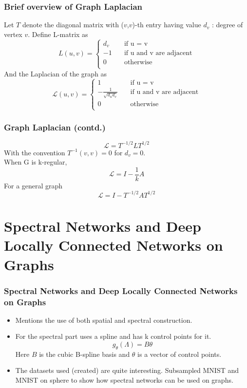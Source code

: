 \documentclass{beamer}
\begin{document}
\begin{frame}
  \frametitle{Brief overview of Graph Laplacian}
  Let $T$ denote the diagonal matrix with ($v$,$v$)-th entry having value $d_v$ : degree of vertex $v$.
  Define L-matrix as
  \[
    L(u,v) =
    \begin{cases}
      d_v &\quad\text{if u = v}\\
      -1 &\quad\text{if u and v are adjacent}\\
      0 &\quad \text{otherwise}\\
    \end{cases}
  \]
  And the Laplacian of the graph as
  \[
    \mathcal{L}(u,v) =
    \begin{cases}
      1 &\quad\text{if u = v}\\
      -\frac{1}{\sqrt{d_ud_v}} &\quad\text{if u and v are adjacent}\\
      0 &\quad \text{otherwise}\\
    \end{cases}
  \]
\end{frame}

\begin{frame}
  \frametitle{Graph Laplacian (contd.)}
  $$\mathcal{L} = T^{-1/2}LT^{1/2}$$
  With the convention $T^{-1}(v,v) = 0$ for $d_v = 0$.\\
  When G is k-regular,
  $$\mathcal{L} = I - \frac{1}{k}A$$
  For a general graph
  $$\mathcal{L} = I - T^{-1/2}AT^{1/2}$$
\end{frame}
\section{Spectral Networks and Deep Locally Connected Networks on Graphs}
\begin{frame}
  \frametitle{Spectral Networks and Deep Locally Connected Networks on Graphs}
  \begin{itemize}
  \item Mentions the use of both spatial and spectral construction.
  \item For the spectral part uses a spline and has k control points for it.
    $$g_{\theta}(\Lambda) = B\theta$$
    Here $B$ is the cubic B-spline basis and $\theta$ is a vector of control points.
  \item The datasets used (created) are quite interesting. Subsampled MNIST and MNIST on sphere to show how spectral networks can be used on graphs.
  \end{itemize}
\end{frame}
\end{document}

